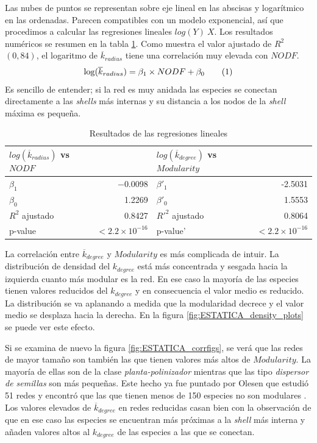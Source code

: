 Las nubes de puntos se representan sobre eje lineal en las abscisas y logarítmico en las ordenadas. Parecen compatibles con un modelo exponencial, así que procedimos a calcular las regresiones lineales $log(Y) ~ X$. Los resultados numéricos se resumen en la tabla \ref{table:table_lmodel}. Como muestra el valor ajustado de $R^2$ $(0,84)$, el logaritmo de $\overline {k}_{radius}$ tiene una correlación muy elevada con $NODF$. 
\begin{align}
\displaystyle \log({\overline k_{radius}}) = \beta_1 \times NODF + \beta_0
\stepcounter{equation}\tag{\theequation}\label{eq:kradius_vs_nodf}
\end{align}
Es sencillo de entender; si la red es muy anidada las especies se conectan directamente a las \textit{shells} más internas y su distancia a los nodos de la \textit{shell} máxima es pequeña. 

\begin{table}[ht]
\centering
\begin{tabular}{|l r | l r|}
\hline
$log(\overline {k}_{radius})$ vs $NODF$& & $log(\overline {k}_{degree})$ vs $Modularity$ & \\
\hline
$\beta_1$ & $-$0.0098 & $\beta'_1$ & -2.5031 \\
$\beta_0$ & 1.2269 & $\beta'_0$ & 1.5553 \\
$R^2$ ajustado&  0.8427  & $R'^2$ ajustado& 0.8064\\
p-value & $<2.2 \times 10^{-16}$& p-value' & $<2.2 \times 10^{-16}$\\
\hline
\end{tabular}
\caption{\label{table:table_lmodel} Resultados de las regresiones lineales}
\end{table}

La correlación entre $\overline {k}_{degree}$ y $Modularity$ es más complicada de intuir. La distribución de densidad del $k_{degree}$ está más concentrada y sesgada hacia la izquierda cuanto más modular es la red. En ese caso la mayoría de las especies tienen valores reducidos del ${k}_{degree}$ y en consecuencia el valor medio es reducido. La distribución se va aplanando a medida que la modularidad decrece y el valor medio se desplaza hacia la derecha. En la figura \ref{fig:ESTATICA_density_plots} se puede ver este efecto.

Si se examina de nuevo la figura \ref{fig:ESTATICA_corrfigs}, se verá que las redes de mayor tamaño son también las que tienen valores más altos de $Modularity$. La mayoría de ellas son de la clase \textit{planta-polinizador} mientras que las tipo \textit{dispersor de semillas} son más pequeñas. Este hecho ya fue puntado por Olesen que estudió 51 redes y encontró que las que tienen menos de 150 especies no son modulares \cite{olesen2007modularity}. Los valores elevados de $\overline {k}_{degree}$ en redes reducidas casan bien con la observación de que en ese caso las especies se encuentran más próximas a la \textit{shell} más interna y añaden valores altos al ${k}_{degree}$ de las especies a las que se conectan.

